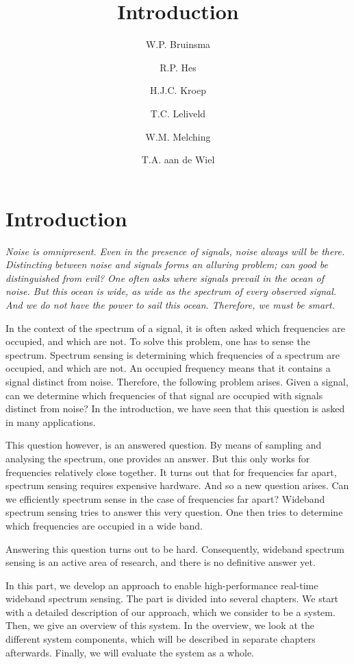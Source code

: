 \documentclass[a4paper, openany, oneside]{memoir}
\title{Introduction}
\author{W.P. Bruinsma \and R.P. Hes \and H.J.C. Kroep \and T.C. Leliveld \and W.M. Melching \and T.A. aan de Wiel}
\begin{document}
\chapter{Introduction}
\textit{Noise is omnipresent. Even in the presence of signals, noise always will be there. Distincting between noise and signals forms an alluring problem; can good be distinguished from evil? One often asks where signals prevail in the ocean of noise. But this ocean is wide, as wide as the spectrum of every observed signal. And we do not have the power to sail this ocean. Therefore, we must be smart.}

In the context of the spectrum of a signal, it is often asked which frequencies are occupied, and which are not. To solve this problem, one has to sense the spectrum. Spectrum sensing is determining which frequencies of a spectrum are occupied, and which are not. An occupied frequency means that it contains a signal distinct from noise. Therefore, the following problem arises. Given a signal, can we determine which frequencies of that signal are occupied with signals distinct from noise? In the introduction, we have seen that this question is asked in many applications.

This question however, is an answered question. By means of sampling and analysing the spectrum, one provides an answer. But this only works for frequencies relatively close together. It turns out that for frequencies far apart, spectrum sensing requires expensive hardware. And so a new question arises. Can we efficiently spectrum sense in the case of frequencies far apart? Wideband spectrum sensing tries to answer this very question. One then tries to determine which frequencies are occupied in a wide band.

Answering this question turns out to be hard. Consequently, wideband spectrum sensing is an active area of research, and there is no definitive answer yet.

In this part, we develop an approach to enable high-performance real-time wideband spectrum sensing. The part is divided into several chapters. We start with a detailed description of our approach, which we consider to be a system. Then, we give an overview of this system. In the overview, we look at the different system components, which will be described in separate chapters afterwards. Finally, we will evaluate the system as a whole.
\end{document}
